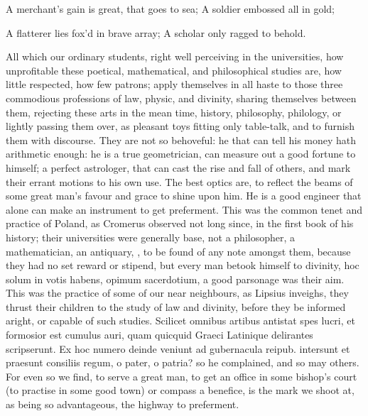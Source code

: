 {{A merchant's gain is great, that goes to sea;
A soldier embossed all in gold;

A flatterer lies fox'd in brave array;
A scholar only ragged to behold.

All which our ordinary students, right well perceiving in the
universities, how unprofitable these poetical, mathematical, and
philosophical studies are, how little respected, how few patrons; apply
themselves in all haste to those three commodious professions of law,
physic, and divinity, sharing themselves between them, rejecting
these arts in the mean time, history, philosophy, philology, or lightly
passing them over, as pleasant toys fitting only table-talk, and to
furnish them with discourse. They are not so behoveful: he that can
tell his money hath arithmetic enough: he is a true geometrician, can
measure out a good fortune to himself; a perfect astrologer, that can
cast the rise and fall of others, and mark their errant motions to his
own use. The best optics are, to reflect the beams of some great man's
favour and grace to shine upon him. He is a good engineer that alone
can make an instrument to get preferment. This was the common tenet and
practice of Poland, as Cromerus observed not long since, in the first
book of his history; their universities were generally base, not a
philosopher, a mathematician, an antiquary, \etc{}, to be found of any
note amongst them, because they had no set reward or stipend, but every
man betook himself to divinity, hoc solum in votis habens, opimum
sacerdotium, a good parsonage was their aim. This was the practice of
some of our near neighbours, as Lipsius inveighs, they thrust
their children to the study of law and divinity, before they be
informed aright, or capable of such studies. Scilicet omnibus artibus
antistat spes lucri, et formosior est cumulus auri, quam quicquid
Graeci Latinique delirantes scripserunt. Ex hoc numero deinde veniunt
ad gubernacula reipub. intersunt et praesunt consiliis regum, o pater,
o patria? so he complained, and so may others. For even so we find, to
serve a great man, to get an office in some bishop's court (to practise
in some good town) or compass a benefice, is the mark we shoot at, as
being so advantageous, the highway to preferment.

}}
